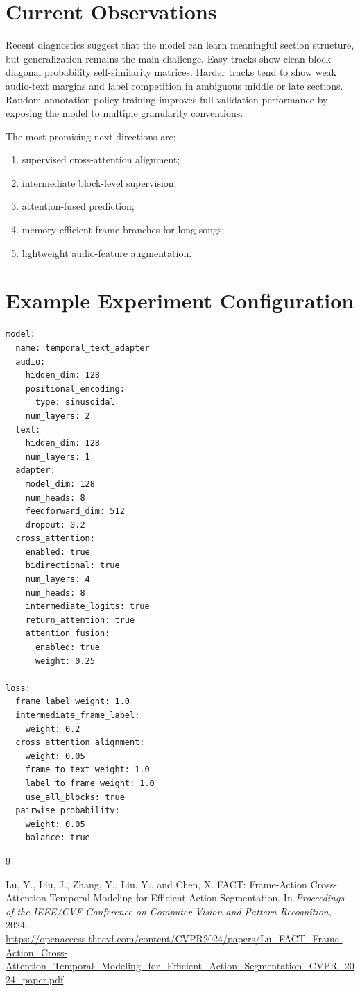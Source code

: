 \documentclass[11pt,a4paper]{article}
\begin{document}
\section{Current Observations}

Recent diagnostics suggest that the model can learn meaningful section structure, but
generalization remains the main challenge. Easy tracks show clean block-diagonal
probability self-similarity matrices. Harder tracks tend to show weak audio-text
margins and label competition in ambiguous middle or late sections. Random annotation
policy training improves full-validation performance by exposing the model to multiple
granularity conventions.

The most promising next directions are:
\begin{enumerate}[leftmargin=*]
  \item supervised cross-attention alignment;
  \item intermediate block-level supervision;
  \item attention-fused prediction;
  \item memory-efficient frame branches for long songs;
  \item lightweight audio-feature augmentation.
\end{enumerate}

\section{Example Experiment Configuration}

\begin{verbatim}
model:
  name: temporal_text_adapter
  audio:
    hidden_dim: 128
    positional_encoding:
      type: sinusoidal
    num_layers: 2
  text:
    hidden_dim: 128
    num_layers: 1
  adapter:
    model_dim: 128
    num_heads: 8
    feedforward_dim: 512
    dropout: 0.2
  cross_attention:
    enabled: true
    bidirectional: true
    num_layers: 4
    num_heads: 8
    intermediate_logits: true
    return_attention: true
    attention_fusion:
      enabled: true
      weight: 0.25

loss:
  frame_label_weight: 1.0
  intermediate_frame_label:
    weight: 0.2
  cross_attention_alignment:
    weight: 0.05
    frame_to_text_weight: 1.0
    label_to_frame_weight: 1.0
    use_all_blocks: true
  pairwise_probability:
    weight: 0.05
    balance: true
\end{verbatim}

\begin{thebibliography}{9}

Lu, Y., Liu, J., Zhang, Y., Liu, Y., and Chen, X.
\newblock FACT: Frame-Action Cross-Attention Temporal Modeling for Efficient Action Segmentation.
\newblock In \emph{Proceedings of the IEEE/CVF Conference on Computer Vision and Pattern Recognition}, 2024.
\newblock \url{https://openaccess.thecvf.com/content/CVPR2024/papers/Lu_FACT_Frame-Action_Cross-Attention_Temporal_Modeling_for_Efficient_Action_Segmentation_CVPR_2024_paper.pdf}

\end{thebibliography}
\end{document}
